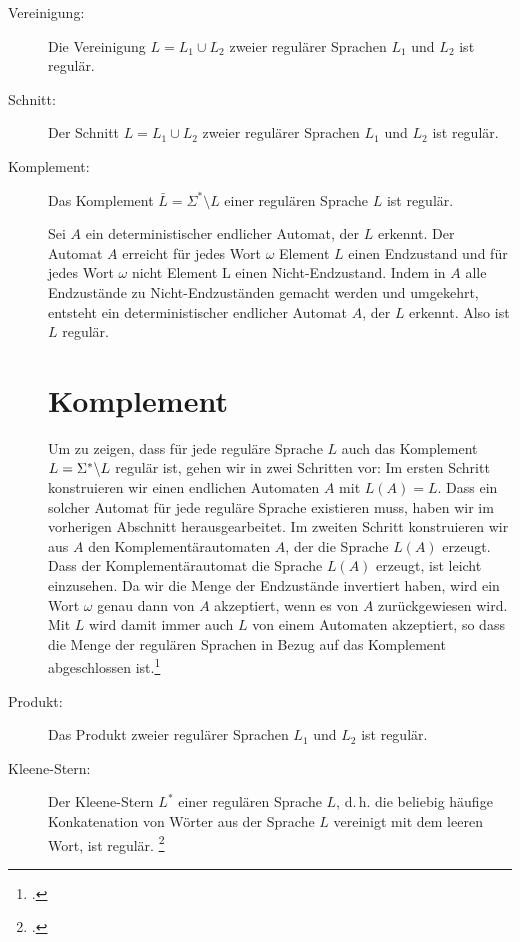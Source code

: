 \documentclass{lehramt-informatik-haupt}
\begin{document}
\begin{description}
\item[Vereinigung:]

Die Vereinigung $L = L_1 \cup L_2$ zweier regulärer Sprachen $L_1$ und
$L_2$ ist regulär.

\item[Schnitt:]

Der Schnitt $L = L_1 \cup L_2$ zweier regulärer Sprachen $L_1$ und $L_2$
ist regulär.

\item[Komplement:]

Das Komplement $\bar L = \Sigma^* \setminus L$ einer regulären Sprache
$L$ ist regulär.

Sei $A$ ein deterministischer endlicher Automat, der $L$
erkennt. Der Automat $A$ erreicht für jedes Wort $\omega$ Element $L$
einen Endzustand und für jedes Wort $\omega$ nicht Element L einen
Nicht-Endzustand. Indem in $A$ alle Endzustände zu Nicht-Endzuständen
gemacht werden und umgekehrt, entsteht ein deterministischer endlicher
Automat $A$, der $L$ erkennt. Also ist $L$ regulär.

\section{Komplement}

Um zu zeigen, dass für jede reguläre Sprache $L$ auch das Komplement $L
= \Sigma^* \string\ L$ regulär ist, gehen wir in zwei Schritten vor: Im
ersten Schritt konstruieren wir einen endlichen Automaten $A$ mit $L (A)
= L$. Dass ein solcher Automat für jede reguläre Sprache existieren
muss, haben wir im vorherigen Abschnitt herausgearbeitet. Im zweiten
Schritt konstruieren wir aus $A$ den Komplementärautomaten $A$, der die
Sprache $L (A)$ erzeugt. Dass der Komplementärautomat die Sprache $L
(A)$ erzeugt, ist leicht einzusehen. Da wir die Menge der Endzustände
invertiert haben, wird ein Wort $\omega$ genau dann von $A$ akzeptiert,
wenn es von $A$ zurückgewiesen wird. Mit $L$ wird damit immer auch $L$
von einem Automaten akzeptiert, so dass die Menge der regulären Sprachen
in Bezug auf das Komplement abgeschlossen ist.\footcite[Seite
218-219]{hoffmann}

\item[Produkt:]

Das Produkt  zweier regulärer
Sprachen $L_1$ und $L_2$ ist regulär.

\item[Kleene-Stern:]

Der Kleene-Stern $L^*$ einer regulären Sprache $L$, d.\,h. die beliebig
häufige Konkatenation von Wörter aus der Sprache $L$ vereinigt mit dem
leeren Wort, ist regulär.
\footcite[Seite 68]{theo:fs:1}
\end{description}
\end{document}
